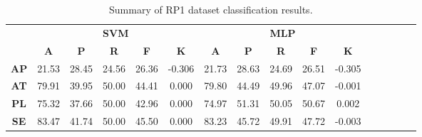 \begin{landscape}
\begin{table}[htbp]
\footnotesize
\centering
\caption{Summary of RP1 dataset classification results.}
\label{tab:base_female}
\begin{tabular}{|c|c|c|c|c|c|c|c|c|c|c|c|c|c|c|c|}
\hline
\multirow{2}{*}{}	& \multicolumn{5}{c|}{\textbf{SVM}}												& \multicolumn{5}{c|}{\textbf{MLP}}												\\ \cline{2-11} 
					& \textbf{A}	& \textbf{P}	& \textbf{R}	& \textbf{F}	& \textbf{K}	& \textbf{A}	& \textbf{P}	& \textbf{R}	& \textbf{F}	& \textbf{K}	\\ \hline
\textbf{AP}			& 21.53			& 28.45			& 24.56			& 26.36			& -0.306			& 21.73			& 28.63			& 24.69			& 26.51			& -0.305			\\ \hline
\textbf{AT}			& 79.91			& 39.95			& 50.00			& 44.41			& 0.000			& 79.80			& 44.49			& 49.96			& 47.07			& -0.001			\\ \hline
\textbf{PL}			& 75.32			& 37.66			& 50.00			& 42.96			& 0.000			& 74.97			& 51.31			& 50.05			& 50.67			& 0.002			\\ \hline
\textbf{SE}			& 83.47			& 41.74			& 50.00			& 45.50			& 0.000			& 83.23			& 45.72			& 49.91			& 47.72			& -0.003			\\ \hline
\end{tabular}
\end{table}
\end{landscape}